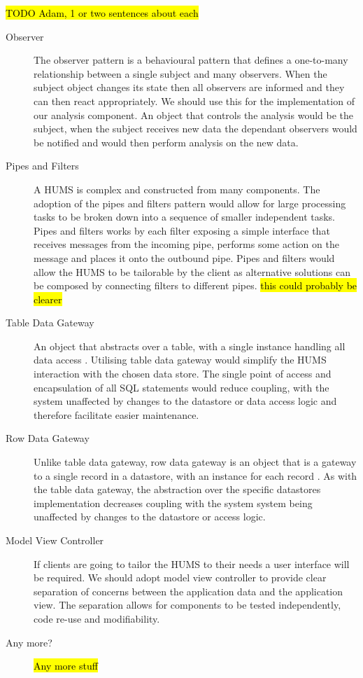 \documentclass[10pt,a4paper]{article}
\begin{document}
\hl{TODO Adam, 1 or two sentences about each}
\begin{description}
\item[Observer] The observer pattern is a behavioural pattern that defines a one-to-many relationship between a single subject and many observers. When the subject object changes its state then all observers are informed and they can then react appropriately. We should use this for the implementation of our analysis component. An object that controls the analysis would be the subject, when the subject receives new data the dependant observers would be notified and would then perform analysis on the new data.
\item[Pipes and Filters] A HUMS is complex and constructed from many components. The adoption of the pipes and filters pattern would allow for large processing tasks to be broken down into a sequence of smaller independent tasks. Pipes and filters works by each filter exposing a simple interface that receives messages from the incoming pipe, performs some action on the message and places it onto the outbound pipe. Pipes and filters would allow the HUMS to be tailorable by the client as alternative solutions can be composed by connecting filters to different pipes. \hl{this could probably be clearer}
\item[Table Data Gateway] An object that abstracts over a table, with a single instance handling all data access \cite{fowler2002patterns}. Utilising table data gateway would simplify the HUMS interaction with the chosen data store. The single point of access and encapsulation of all SQL statements would reduce coupling, with the system unaffected by changes to the datastore or data access logic and therefore facilitate easier maintenance.
\item[Row Data Gateway] Unlike table data gateway, row data gateway is an object that is a gateway to a single record in a datastore, with an instance for each record \cite{fowler2002patterns}. As with the table data gateway, the abstraction over the specific datastores implementation decreases coupling with the system system being unaffected by changes to the datastore or access logic.
\item[Model View Controller] If clients are going to tailor the HUMS to their needs a user interface will be required. We should adopt model view controller to provide clear separation of concerns between the application data and the application view. The separation allows for components to be tested independently, code re-use and modifiability.
\item[Any more?] \hl{Any more stuff}
\end{description}
\end{document}

